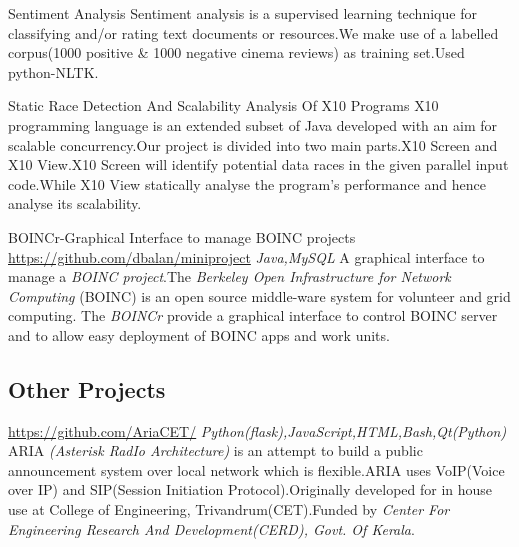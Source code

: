 \documentclass[11pt,a4paper,sans]{moderncv}
\begin{document}
{Sentiment Analysis}{}{}{}
{Sentiment analysis is a supervised learning technique for classifying and/or rating text documents or resources.We make use of a labelled corpus(1000 positive \& 1000 negative cinema reviews) as training set.Used python-NLTK.\newline}

{Static Race Detection And Scalability Analysis Of X10 Programs}{}{}{}
{X10 programming language is an extended subset of Java developed with an aim for
scalable concurrency.Our project is divided into two main parts.X10 Screen and X10 View.X10 Screen will identify potential data races in the given parallel input code.While X10 View statically analyse the program's performance and hence analyse its scalability.\newline}

{BOINCr-Graphical Interface to manage BOINC projects}
{\newline \url{https://github.com/dbalan/miniproject}}{}
{\hfill \textit{Java,MySQL}}
{A graphical interface to manage a \textit{BOINC project}.The \textit{Berkeley Open Infrastructure for Network Computing }(BOINC) is an open source middle-ware system for volunteer and grid computing. The \textit{BOINCr} provide a graphical interface to control BOINC server and to allow easy deployment of BOINC apps and work units.\newline}

\subsection{Other Projects}

{\newline \url{https://github.com/AriaCET/}\newline}{}
{\hfill \textit{Python(flask),JavaScript,HTML,Bash,Qt(Python)}}
{ARIA \textit{(Asterisk RadIo Architecture)} is an attempt to build a public announcement system over local network which is flexible.ARIA uses VoIP(Voice over IP) and SIP(Session Initiation Protocol).Originally developed for in house use at College of Engineering, Trivandrum(CET).Funded by \textit{Center For Engineering Research And Development(CERD), Govt. Of Kerala}.\newline}
\end{document}
